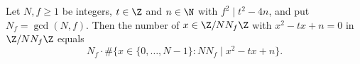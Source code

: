 Let $N,f\ge1$ be integers, $t\in\Z$ and $n\in\N$ with $f^2\mid t^2-4n$, and put $N_f=\gcd(N,f)$. Then the number of $x\in\Z/NN_f\Z$ with
$x^2-tx+n=0$ in $\Z/NN_f\Z$ equals
\[
  N_f\cdot\#\{x\in\{0,\dots,N-1\}:NN_f\mid x^2-tx+n\}.
\]
